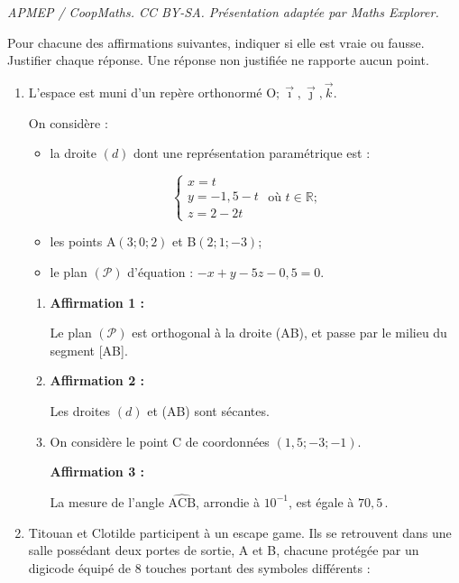 \documentclass[10pt]{article}
\providecommand{\R}{\mathbb{R}}
\providecommand{\Oijk}{\(\mathrm{O};\vec{\imath},\vec{\jmath},\vec{k}\)}
\begin{document}
\noindent\textit{APMEP / CoopMaths. CC BY-SA. Présentation adaptée par Maths Explorer.}\par\medskip
Pour chacune des affirmations suivantes, indiquer si elle est vraie ou fausse. Justifier chaque réponse. Une réponse non justifiée ne rapporte aucun point.

	\begin{enumerate}[itemsep=1cm]
		\item L'espace est muni d'un repère orthonormé \Oijk{}.

		On considère :

		\begin{itemize}[label={\textbullet~}]
			\item la droite $(d)$ dont une représentation paramétrique est :
		\end{itemize}
		\[\begin{cases}
				x=t \\
			y=-1,5-t \\
			z=2-2 t
		\end{cases}\text { où } t \in \R; \]
		\begin{itemize}[label={\textbullet~}]
			\item les points A$(3 ; 0 ; 2)$ et B$(2 ; 1 ;-3)$;

			\item le plan $(\mathcal{P})$ d'équation : \quad $-x+y-5 z-0,5=0$.
		\end{itemize}

		\begin{enumerate}[itemsep=5mm]
			\item \textbf{Affirmation 1 :}

			Le plan $(\mathcal{P})$ est orthogonal à la droite (AB), et passe par le milieu du segment [AB].

			\item \textbf{Affirmation 2 :}

			Les droites $(d)$ et (AB) sont sécantes.

			\item On considère le point C de coordonnées $(1,5 ; -3 ; -1)$.

			\textbf{Affirmation 3 :}

			La mesure de l'angle $\widehat{\mathrm{ACB}}$, arrondie à $10^{-1}$, est égale à $70,5$\,\textdegree.
		\end{enumerate}

		\item Titouan et Clotilde participent à un escape game. Ils se retrouvent dans une salle possédant deux portes de sortie, A et B, chacune protégée par un digicode équipé de 8 touches portant des symboles différents :


\end{enumerate}
\end{document}
